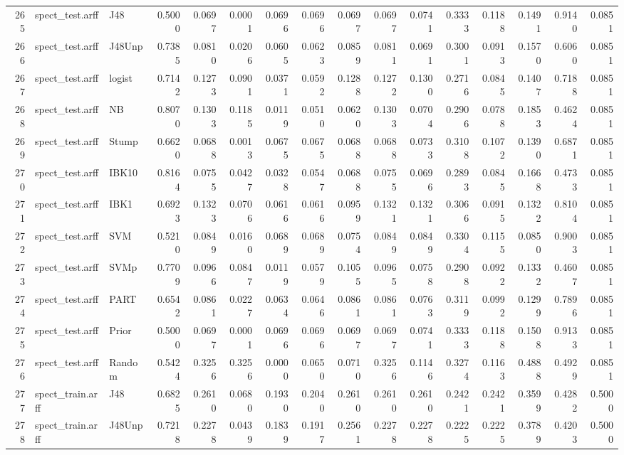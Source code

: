 \documentclass {article}
\begin{document}
\begin{table}[ht]
\begin{tabular}{rllrrrrrrrrrrrrr}
  265 & spect\_test.arff & J48 & 0.5000 & 0.0697 & 0.0001 & 0.0696 & 0.0696 & 0.0697 & 0.0697 & 0.0741 & 0.3333 & 0.1188 & 0.1491 & 0.9140 & 0.0851 \\ 
  266 & spect\_test.arff & J48Unp & 0.7385 & 0.0810 & 0.0206 & 0.0605 & 0.0623 & 0.0859 & 0.0811 & 0.0691 & 0.3001 & 0.0913 & 0.1570 & 0.6060 & 0.0851 \\ 
  267 & spect\_test.arff & logist & 0.7142 & 0.1273 & 0.0901 & 0.0371 & 0.0592 & 0.1288 & 0.1272 & 0.1300 & 0.2716 & 0.0845 & 0.1407 & 0.7188 & 0.0851 \\ 
  268 & spect\_test.arff & NB & 0.8070 & 0.1303 & 0.1185 & 0.0119 & 0.0510 & 0.0620 & 0.1303 & 0.0704 & 0.2906 & 0.0788 & 0.1853 & 0.4624 & 0.0851 \\ 
  269 & spect\_test.arff & Stump & 0.6620 & 0.0688 & 0.0013 & 0.0675 & 0.0675 & 0.0688 & 0.0688 & 0.0733 & 0.3108 & 0.1072 & 0.1390 & 0.6871 & 0.0851 \\ 
  270 & spect\_test.arff & IBK10 & 0.8164 & 0.0755 & 0.0427 & 0.0328 & 0.0547 & 0.0688 & 0.0755 & 0.0696 & 0.2893 & 0.0845 & 0.1668 & 0.4733 & 0.0851 \\ 
  271 & spect\_test.arff & IBK1 & 0.6923 & 0.1323 & 0.0706 & 0.0616 & 0.0616 & 0.0959 & 0.1321 & 0.1321 & 0.3066 & 0.0915 & 0.1322 & 0.8104 & 0.0851 \\ 
  272 & spect\_test.arff & SVM & 0.5210 & 0.0849 & 0.0160 & 0.0689 & 0.0689 & 0.0754 & 0.0849 & 0.0849 & 0.3304 & 0.1155 & 0.0850 & 0.9003 & 0.0851 \\ 
  273 & spect\_test.arff & SVMp & 0.7709 & 0.0966 & 0.0847 & 0.0119 & 0.0579 & 0.1055 & 0.0965 & 0.0758 & 0.2908 & 0.0922 & 0.1332 & 0.4607 & 0.0851 \\ 
  274 & spect\_test.arff & PART & 0.6542 & 0.0861 & 0.0227 & 0.0634 & 0.0646 & 0.0861 & 0.0861 & 0.0763 & 0.3119 & 0.0992 & 0.1299 & 0.7896 & 0.0851 \\ 
  275 & spect\_test.arff & Prior & 0.5000 & 0.0697 & 0.0001 & 0.0696 & 0.0696 & 0.0697 & 0.0697 & 0.0741 & 0.3333 & 0.1188 & 0.1508 & 0.9133 & 0.0851 \\ 
  276 & spect\_test.arff & Random & 0.5424 & 0.3256 & 0.3256 & 0.0000 & 0.0650 & 0.0710 & 0.3256 & 0.1146 & 0.3274 & 0.1163 & 0.4888 & 0.4929 & 0.0851 \\ 
  277 & spect\_train.arff & J48 & 0.6825 & 0.2610 & 0.0680 & 0.1930 & 0.2040 & 0.2610 & 0.2610 & 0.2610 & 0.2421 & 0.2421 & 0.3599 & 0.4282 & 0.5000 \\ 
  278 & spect\_train.arff & J48Unp & 0.7218 & 0.2278 & 0.0439 & 0.1839 & 0.1917 & 0.2561 & 0.2278 & 0.2278 & 0.2225 & 0.2225 & 0.3789 & 0.4203 & 0.5000 \\ 

\end{tabular}
\end{table}
\end{document}
